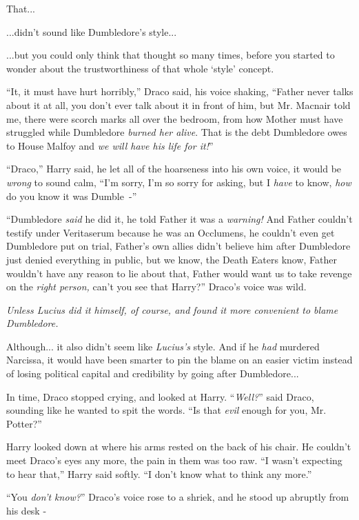 That...

...didn't sound like Dumbledore's style...

...but you could only think that thought so many times, before you started to wonder about the trustworthiness of that whole `style' concept.

``It, it must have hurt horribly,'' Draco said, his voice shaking, ``Father never talks about it at all, you don't ever talk about it in front of him, but Mr. Macnair told me, there were scorch marks all over the bedroom, from how Mother must have struggled while Dumbledore \emph{burned her alive}. That is the debt Dumbledore owes to House Malfoy and \emph{we will have his life for it!}''

``Draco,'' Harry said, he let all of the hoarseness into his own voice, it would be \emph{wrong} to sound calm, ``I'm sorry, I'm so sorry for asking, but I \emph{have} to know, \emph{how} do you know it was Dumble~-''

``Dumbledore \emph{said} he did it, he told Father it was a \emph{warning!} And Father couldn't testify under Veritaserum because he was an Occlumens, he couldn't even get Dumbledore put on trial, Father's own allies didn't believe him after Dumbledore just denied everything in public, but we know, the Death Eaters know, Father wouldn't have any reason to lie about that, Father would want us to take revenge on the \emph{right person,} can't you see that Harry?'' Draco's voice was wild.

\emph{Unless Lucius did it himself, of course, and found it more convenient to blame Dumbledore.}

Although... it also didn't seem like \emph{Lucius's} style. And if he \emph{had} murdered Narcissa, it would have been smarter to pin the blame on an easier victim instead of losing political capital and credibility by going after Dumbledore...

In time, Draco stopped crying, and looked at Harry. ``\emph{Well?}'' said Draco, sounding like he wanted to spit the words. ``Is that \emph{evil} enough for you, Mr. Potter?''

Harry looked down at where his arms rested on the back of his chair. He couldn't meet Draco's eyes any more, the pain in them was too raw. ``I wasn't expecting to hear that,'' Harry said softly. ``I don't know what to think any more.''

``You \emph{don't know?}'' Draco's voice rose to a shriek, and he stood up abruptly from his desk -


